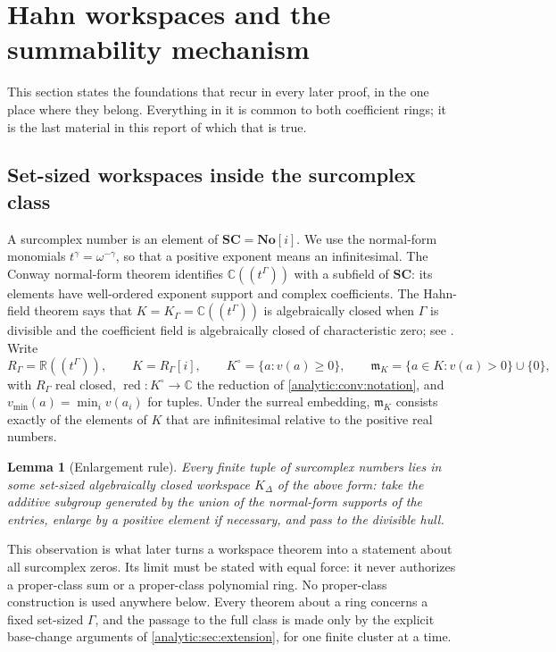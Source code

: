 \documentclass[11pt,letterpaper]{article}
\newtheorem{lemma}[theorem]{Lemma}
\theoremstyle{definition}
\theoremstyle{remark}
\newcommand{\C}{\mathbb C}
\newcommand{\R}{\mathbb R}
\newcommand{\No}{\mathbf{No}}
\newcommand{\SC}{\mathbf{SC}}
\newcommand{\m}{\mathfrak m}
\newcommand{\red}{\operatorname{red}}
\newcommand{\vmin}{v_{\min}}
\numberwithin{equation}{section}
\begin{document}
\section{Hahn workspaces and the summability mechanism}
\label{analytic:sec:hahn}

This section states the foundations that recur in every later proof, in the
one place where they belong. Everything in it is common to both coefficient
rings; it is the last material in this report of which that is true.

\subsection{Set-sized workspaces inside the surcomplex class}
\label{analytic:subsec:workspace}
A surcomplex number is an element of $\SC=\No[i]$. We use the normal-form
monomials $t^\gamma=\omega^{-\gamma}$, so that a positive exponent means an
infinitesimal. The Conway normal-form theorem identifies $\C((t^\Gamma))$
with a subfield of $\SC$: its elements have well-ordered exponent support
and complex coefficients. The Hahn-field theorem says that
$K=K_\Gamma=\C((t^\Gamma))$ is algebraically closed when $\Gamma$ is
divisible and the coefficient field is algebraically closed of
characteristic zero; see \cite[Corollary 4]{Poonen}. Write
\[
 R_\Gamma=\R((t^\Gamma)),\qquad K=R_\Gamma[i],\qquad
 K^\circ=\{a:v(a)\ge0\},\qquad
 \m_K=\{a\in K:v(a)>0\}\cup\{0\},
\]
with $R_\Gamma$ real closed, $\red:K^\circ\to\C$ the reduction of
\cref{analytic:conv:notation}, and $\vmin(a)=\min_iv(a_i)$ for tuples. Under
the surreal embedding, $\m_K$ consists exactly of the elements of $K$ that
are infinitesimal relative to the positive real numbers.

\begin{lemma}[Enlargement rule]\label{analytic:lem:enlargement}
Every finite tuple of surcomplex numbers lies in some set-sized
algebraically closed workspace $K_\Delta$ of the above form: take the
additive subgroup generated by the union of the normal-form supports of the
entries, enlarge by a positive element if necessary, and pass to the
divisible hull.
\end{lemma}

This observation is what later turns a workspace theorem into a statement
about all surcomplex zeros. Its limit must be stated with equal force: it
never authorizes a proper-class sum or a proper-class polynomial ring. No
proper-class construction is used anywhere below. Every theorem about a ring
concerns a fixed set-sized $\Gamma$, and the passage to the full class is
made only by the explicit base-change arguments of
\cref{analytic:sec:extension}, for one finite cluster at a time.
\end{document}
